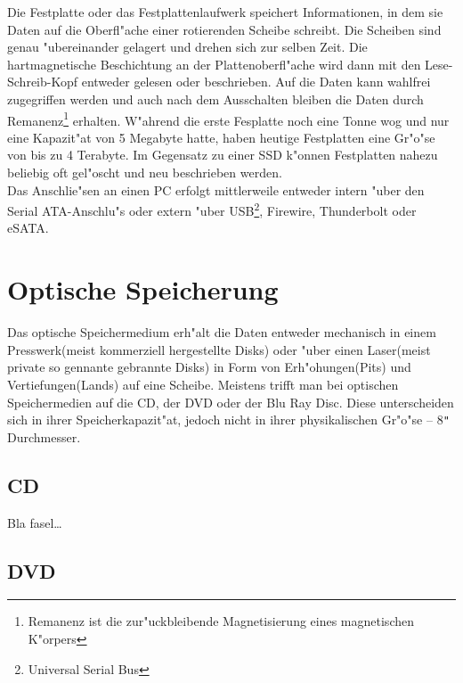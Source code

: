             Die Festplatte oder das Festplattenlaufwerk speichert Informationen, in dem sie Daten auf die Oberfl"ache einer rotierenden Scheibe schreibt. Die Scheiben sind genau "ubereinander gelagert und drehen sich zur selben Zeit. Die hartmagnetische Beschichtung an der Plattenoberfl"ache wird dann mit den Lese-Schreib-Kopf entweder gelesen oder beschrieben. Auf die Daten kann wahlfrei zugegriffen werden und auch nach dem Ausschalten bleiben die Daten durch Remanenz\footnote[7]{Remanenz ist die zur"uckbleibende Magnetisierung eines magnetischen K"orpers} erhalten. W"ahrend die erste Fesplatte noch eine Tonne wog und nur eine Kapazit"at von 5 Megabyte hatte, haben heutige Festplatten eine Gr"o"se von bis zu 4 Terabyte. Im Gegensatz zu einer SSD k"onnen Festplatten nahezu beliebig oft gel"oscht und neu beschrieben werden.
            \\
            Das Anschlie"sen an einen PC erfolgt mittlerweile entweder intern "uber den Serial ATA-Anschlu"s oder extern "uber USB\footnote[8]{Universal Serial Bus}, Firewire, Thunderbolt oder eSATA. 
    
    
    \section{Optische Speicherung}
    \label{ch:Technisch:sec:Optische Speicherung}
    
        Das optische Speichermedium erh"alt die Daten entweder mechanisch in einem Presswerk(meist kommerziell hergestellte Disks) oder "uber einen Laser(meist private so gennante \glqq gebrannte\grqq{} Disks) in Form von Erh"ohungen(Pits) und Vertiefungen(Lands) auf eine Scheibe. Meistens trifft man bei optischen Speichermedien auf die CD, der DVD oder der Blu Ray Disc. Diese unterscheiden sich in ihrer Speicherkapazit"at, jedoch nicht in ihrer physikalischen Gr"o"se – 8\texttt{"{}} Durchmesser.
        \subsection{CD}
        \label{ch:Technisch:sec:Optische Speicherung:sub:CD}
        
            Bla fasel\ldots
        
        \subsection{DVD}
        \label{ch:Technisch:sec:Optische Speicherung:sub:DVD}
        
